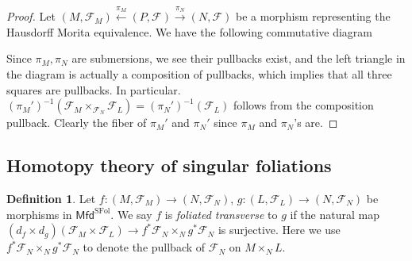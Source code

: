 \documentclass[12pt]{amsart}
\theoremstyle{definition}
\newtheorem{defn}[thm]{Definition}
\theoremstyle{remark}
\numberwithin{equation}{section}
\newcommand{\CF}{{\mathcal F}}
\newcommand{\1}{{\mathbb{1}}}
\newcommand{\mfd}{\mathsf{Mfd}}
\newcommand{\sfol}{{\operatorname{SFol}}}
\begin{document}
\begin{proof}
Let $(M, \CF_M) \stackrel{\pi_M}{\leftarrow} (P,\CF)\stackrel{\pi_N}{\rightarrow} (N, \CF)$ be a morphism representing the Hausdorff Morita equivalence. We have the following commutative diagram
\begin{center}
\end{center}
Since $\pi_M, \pi_N$ are submersions, we see their pullbacks exist, and the left triangle in the diagram is actually a composition of pullbacks, which implies that all three squares are pullbacks. In particular.  $(\pi_M')^{-1}(\CF_M\times_{\CF_N} \CF_L) = (\pi_N')^{-1}(\CF_L)$ follows from the composition pullback. Clearly the fiber of $\pi_M'$ and $\pi_N'$ since $\pi_M$ and $\pi_N$'s are.
\end{proof}

\subsection{Homotopy theory of singular foliations}

\begin{defn}
    Let $f:(M, \CF_M)
    \to (N, \CF_N)$, $g: (L, \CF_L) \to (N, \CF_N)$ be morphisms in $ \mfd^{\sfol}$. We say $f$ is {\it foliated transverse} to  $g$ if the natural map $(d_f\times d_g) (\CF_M \times \CF_L) \to f^*\CF_N \times_N g^* \CF_N$ is surjective. Here we use $f^*\CF_N \times_N g^* \CF_N$  to denote the pullback of $\CF_N$ on $M\times_N L$.
\end{defn}
\end{document}
